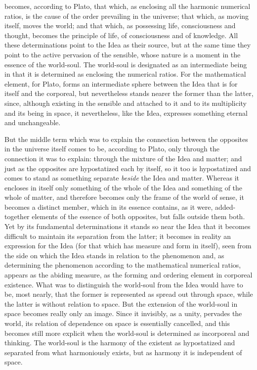 becomes, according to Plato, that which, as enclosing all the harmonic numerical ratios, is
the cause of the order prevailing in the universe; that which, as moving itself, moves the
world; and that which, as possessing life, consciousness and thought, becomes the principle
of life, of consciousness and of knowledge. All these determinations point to the Idea as
their source, but at the same time they point to the active pervasion of the sensible,
whose nature is a moment in the essence of the world-soul. The world-soul is designated as
an intermediate being in that it is determined as enclosing the numerical ratios. For the
mathematical element, for Plato, forms an intermediate sphere between the Idea that is for itself
and the corporeal, but nevertheless stands nearer the former than the latter, since,
although existing in the sensible and attached to it and to its multiplicity and its being
in space, it nevertheless, like the Idea, expresses something eternal and unchangeable.

But the middle term which was to explain the connection between the opposites in the
universe itself comes to be, according to Plato, only through the connection it was to
explain: through the mixture of the Idea and matter; and just as the opposites are
hypostatized each by itself, so it too is hypostatized and comes to stand as something
separate \emph{beside} the Idea and matter. Whereas it encloses in itself only something of
the whole of the Idea and something of the whole of matter, and therefore becomes only the
frame of the world of sense, it becomes a distinct member, which in its essence contains,
as it were, added-together elements of the essence of both opposites, but falls outside
them both. Yet by its fundamental determinations it stands so near the Idea that
it becomes difficult to maintain its separation from the latter; it becomes in reality an
expression for the Idea (for that which has measure and form in itself), seen from the side
on which the Idea stands in relation to the phenomenon and, as determining the phenomenon
according to the mathematical numerical ratios, appears as the abiding measure, as the
forming and ordering element in corporeal existence. What was to distinguish the
world-soul from the Idea would have to be, most nearly, that the former is represented as
spread out through space, while the latter is without relation to space. But the extension
of the world-soul in space becomes really only an image. Since it invisibly, as a unity,
pervades the world, its relation of dependence on space is essentially cancelled, and this
becomes still more explicit when the world-soul is determined as incorporeal and thinking.
The world-soul is the harmony of the existent as hypostatized and separated from what
harmoniously exists, but as harmony it is independent of space.

